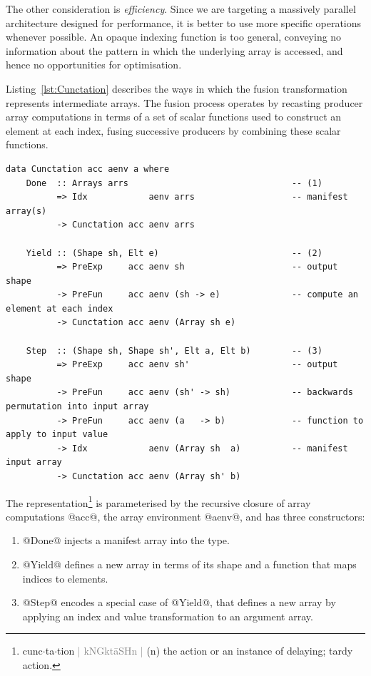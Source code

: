 The other consideration is \emph{efficiency}. Since we are targeting a massively
parallel architecture designed for performance, it is better to use more
specific operations whenever possible. An opaque indexing function is too
general, conveying no information about the pattern in which the underlying
array is accessed, and hence no opportunities for optimisation.

Listing~\ref{lst:Cunctation} describes the ways in which the fusion
transformation represents intermediate arrays. The fusion process operates by
recasting producer array computations in terms of a set of scalar functions used
to construct an element at each index, %
fusing successive producers by combining these scalar functions.
%
\begin{lstlisting}[style=haskell_float
    ,label=lst:Cunctation
    ,caption={Representation of fusible producer arrays}]
data Cunctation acc aenv a where
    Done  :: Arrays arrs                                -- (1)
          => Idx            aenv arrs                   -- manifest array(s)
          -> Cunctation acc aenv arrs

    Yield :: (Shape sh, Elt e)                          -- (2)
          => PreExp     acc aenv sh                     -- output shape
          -> PreFun     acc aenv (sh -> e)              -- compute an element at each index
          -> Cunctation acc aenv (Array sh e)

    Step  :: (Shape sh, Shape sh', Elt a, Elt b)        -- (3)
          => PreExp     acc aenv sh'                    -- output shape
          -> PreFun     acc aenv (sh' -> sh)            -- backwards permutation into input array
          -> PreFun     acc aenv (a   -> b)             -- function to apply to input value
          -> Idx            aenv (Array sh  a)          -- manifest input array
          -> Cunctation acc aenv (Array sh' b)
\end{lstlisting}
%
\makeatchar
The representation\footnote{%
cunc$\cdot$ta$\cdot$tion
\textcolor{gray}{|
kNGk\textquotesingle t\={a}SHn \enspace{}\textquotesingle {}
|} (n) the action or an instance of delaying; tardy action.}
\makeatcode
%
is parameterised by the recursive closure of array computations @acc@, the
array environment @aenv@, and has three constructors:
%
\begin{enumerate}
\item @Done@ injects a manifest array into the type.

\item @Yield@ defines a new array in terms of its shape and a function
    that maps indices to elements.

\item @Step@ encodes a special case of @Yield@, that defines a new
    array by applying an index and value transformation to an argument array.

\end{enumerate}


